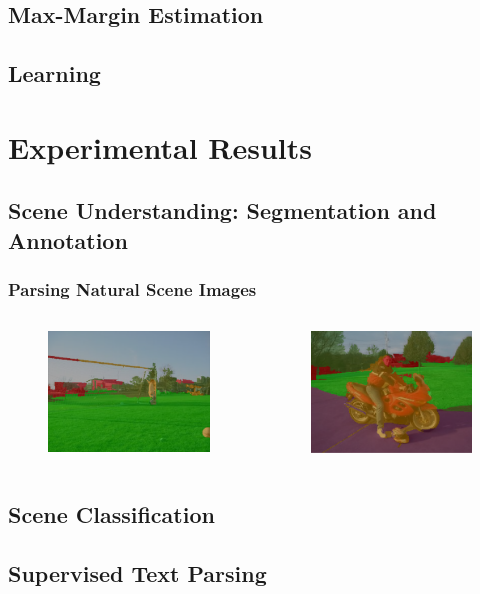 \documentclass{beamer}
\begin{document}
\subsection{Max-Margin Estimation}
\frame
{
}
\subsection{Learning}
\frame
{
}
\section{Experimental Results}
\subsection{Scene Understanding: Segmentation and Annotation}
\frame
{
  \frametitle{Parsing Natural Scene Images}
  \begin{columns}
  \begin{figure}[ht]  
	  \begin{center}
		  \includegraphics[width=2.1in]{images/ex1_ext.png}   
	  \end{center}   
  \end{figure}
  \begin{figure}[ht]
	  \begin{center}
		  \includegraphics[width=2.1in]{images/ex1_ext2.png} 
	  \end{center}
  \end{figure}
  \end{columns}
}
\subsection{Scene Classification}
\frame
{
}
\subsection{Supervised Text Parsing}
\frame
{
}
\end{document}
